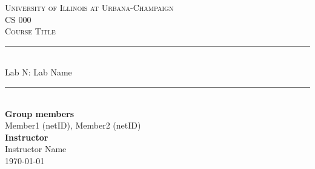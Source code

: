 \documentclass[
    11pt,
    letterpaper,
    onecolumn
]{article}
\begin{document}

\begin{titlepage}
\centering

\textsc{\LARGE University of Illinois at Urbana-Champaign}\\[2cm]
\textsc{\Large CS 000}\\[0.5cm]
\textsc{\Large Course Title}\\[3cm]

\newcommand{\HRule}{\rule{\linewidth}{0.5mm}}
\HRule \\[0.5cm]
{\huge Lab N: Lab Name}\\[0.5cm] %
\HRule \\[6cm]

\textbf{Group members} \\[0.2cm]
Member1 (netID), Member2 (netID) \\[0.2cm]
\textbf{Instructor} \\[0.2cm]
Instructor Name \\[3cm]

{\today}

\end{titlepage}
\newpage



%
%






\section{} %
\end{document}
